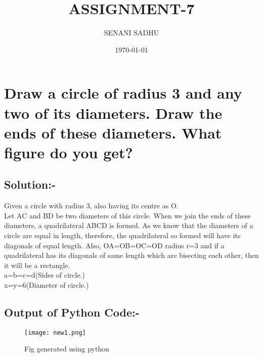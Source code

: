 \documentclass[a4paper,12pt]{article}
\title{ASSIGNMENT-7}
\author{SENANI SADHU}
\date{\today}
\begin{document}
		\maketitle
	\newpage
	\section{Draw a circle of radius 3 and any two of its
		diameters. Draw the ends of these diameters.
		What figure do you get?}
	\subsection{Solution:-}
	Given a circle with radius 3, also having its centre as O.\\
	 Let AC and BD be two diameters of this circle. When we join the ends of these diameters, a quadrilateral ABCD is formed.
	As we know that the diameters of a circle are equal in length, therefore, the quadrilateral so formed will have its diagonals of equal length.
	Also, OA=OB=OC=OD radius r=3 and if a quadrilateral has its diagonals of same length which are bisecting each other, then it will be a rectangle.\\
	a=b=c=d(Sides of circle.)\\
	x=y=6(Diameter of circle.)
	\begin{center}
	\end{center}
\subsection{Output of Python Code:-}
\begin{figure}[htp]
	\centering
	\texttt{[image: new1.png]}
	\caption{Fig generated using python}
\end{figure}
\end{document}
